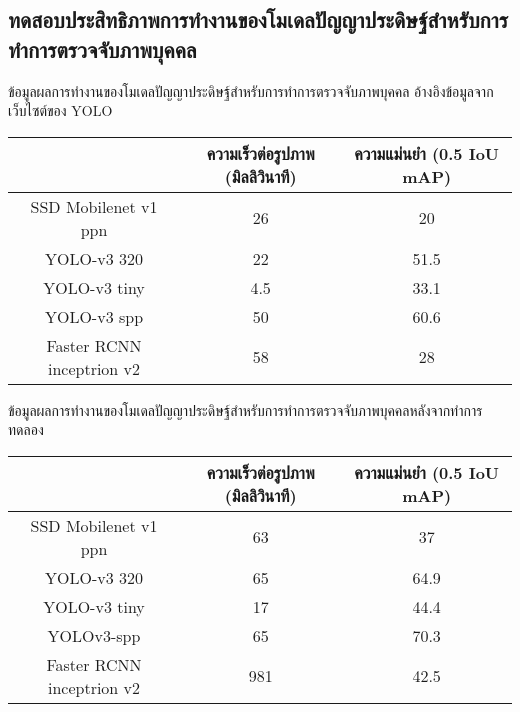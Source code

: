 
\subsection{ทดสอบประสิทธิภาพการทำงานของโมเดลปัญญาประดิษฐ์สำหรับการทำการตรวจจับภาพบุคคล}
ข้อมูลผลการทำงานของโมเดลปัญญาประดิษฐ์สำหรับการทำการตรวจจับภาพบุคคล อ้างอิงข้อมูลจากเว็บไซต์ของ YOLO
\begin{table}[!ht]
	\begin{tabular}{|c|c|c|}
		\hline
		{}&{ความเร็วต่อรูปภาพ (มิลลิวินาที)}&{ความแม่นยำ (0.5 IoU mAP)}			\\
		\hline
		SSD Mobilenet v1 ppn	 		& 26				& 20														\\
		YOLO-v3 320				& 22				& 51.5				\\	
		YOLO-v3 tiny				& 4.5				& 33.1				\\
		YOLO-v3 spp				& 50				& 60.6				\\	
		Faster RCNN inceptrion v2		& 58				& 28		\\
	\hline
	\end{tabular}
\end{table}

ข้อมูลผลการทำงานของโมเดลปัญญาประดิษฐ์สำหรับการทำการตรวจจับภาพบุคคลหลังจากทำการทดลอง
\begin{table}[!ht]
	\begin{tabular}{|c|c|c|}
		\hline 
		{}&{ความเร็วต่อรูปภาพ (มิลลิวินาที)}&{ความแม่นยำ (0.5 IoU mAP)}			\\
		\hline
		SSD Mobilenet v1 ppn	 					& 63 			& 37			\\
		YOLO-v3 320							& 65			& 64.9		\\
		YOLO-v3 tiny							& 17			& 44.4			\\
		YOLOv3-spp							& 65			& 70.3			\\	
		Faster RCNN inceptrion v2					& 981		& 42.5		\\
		\hline
	\end{tabular}
\end{table}
